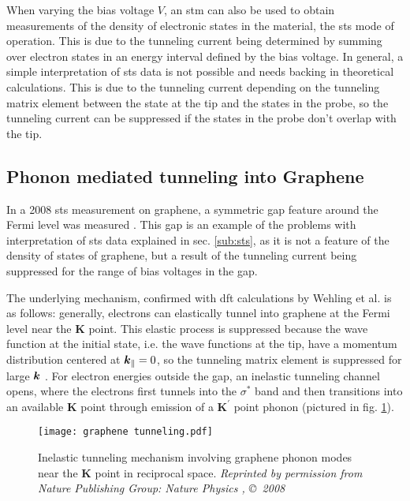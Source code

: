 \documentclass[main.tex]{subfiles}
\begin{document}
When varying the bias voltage \(V\), an \acrshort{stm} can also be used to obtain measurements of the density of electronic states in the material, the \acrfull{sts} mode of operation.
This is due to the tunneling current being determined by summing over electron states in an energy interval defined by the bias voltage.
In general, a simple interpretation of \acrshort{sts} data is not possible and needs backing in theoretical calculations.
This is due to the tunneling current depending on the tunneling matrix element between the state at the tip and the states in the probe, so the tunneling current can be suppressed if the states in the probe don't overlap with the tip.


\subsection{Phonon mediated tunneling into Graphene}\label{sub:tunneling_graphene}

In a 2008 \acrshort{sts} measurement on graphene, a symmetric gap feature around the Fermi level was measured \cite{zhang_giant_2008}.
This gap is an example of the problems with interpretation of \acrshort{sts} data explained in sec. \ref{sub:sts}, as it is not a feature of the density of states of graphene, but a result of the tunneling current being suppressed for the range of bias voltages in the gap.

The underlying mechanism, confirmed with \acrshort{dft} calculations by Wehling et al. \cite{wehling_phonon-mediated_2008} is as follows:
generally, electrons can elastically tunnel into graphene at the Fermi level near the \(\boldsymbol{K}\) point.
This elastic process is suppressed because the wave function at the initial state, i.e. the wave functions at the tip, have a momentum distribution centered at \(\vb*{k}_{\parallel} = 0\), so the tunneling matrix element is suppressed for large \(\vb*{k}\) \cite{vitali_phonon_2004}.
For electron energies outside the gap, an inelastic tunneling channel opens, where the electrons first tunnels into the \(\sigma^*\) band and then transitions into an available \(\boldsymbol{K}\) point through emission of a \(\boldsymbol{K}^{\prime}\) point phonon (pictured in fig. \ref{fig:graphene_tunneling}).

\begin{figure}
    \centering
    \texttt{[image: graphene tunneling.pdf]}
    \caption{Inelastic tunneling mechanism involving graphene phonon modes near the \(\boldsymbol{K}\) point in reciprocal space. \emph{Reprinted by permission from Nature Publishing Group: Nature Physics \cite{zhang_giant_2008}, \copyright\, 2008}}
    \label{fig:graphene_tunneling}
\end{figure}
\end{document}
